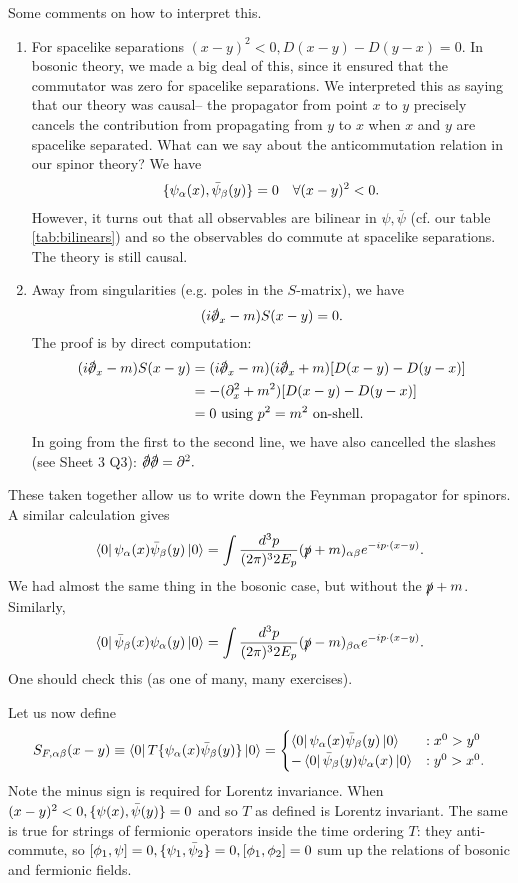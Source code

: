Some comments on how to interpret this.
\begin{enumerate}
    \item For spacelike separations $(x-y)^2<0, D(x-y)-D(y-x)=0$. In bosonic theory, we made a big deal of this, since it ensured that the commutator was zero for spacelike separations. We interpreted this as saying that our theory was causal-- the propagator from point $x$ to $y$ precisely cancels the contribution from propagating from $y$ to $x$ when $x$ and $y$ are spacelike separated. What can we say about the anticommutation relation in our spinor theory? We have
    $$\{\psi_\alpha(x),\bar \psi_\beta(y)\}=0\quad \forall(x-y)^2<0.$$
    However, it turns out that all observables are bilinear in $\psi,\bar \psi$ (cf. our table \ref{tab:bilinears}) and so the observables do commute at spacelike separations. The theory is still causal.
    \item Away from singularities (e.g. poles in the $S$-matrix), we have
    $$(i\slashed \p_x - m)S(x-y)=0.$$ The proof is by direct computation:
    \begin{align*}
        (i\slashed \p_x - m)S(x-y)&= (i\slashed \p_x -m)(i\slashed{\p}_x+m)[D(x-y)-D(y-x)]\\
        &=-(\p_x^2+m^2)[D(x-y)-D(y-x)]\\
        &=0 \text{ using }p^2=m^2 \text{ on-shell}.
    \end{align*}
    In going from the first to the second line, we have also cancelled the slashes (see Sheet 3 Q3): $\slashed{\p}\slashed{\p}=\p^2.$
\end{enumerate}

These taken together allow us to write down the Feynman propagator for spinors. A similar calculation gives
$$\left< 0 \right|\psi_\alpha(x)\bar \psi_\beta (y)\left| 0 \right>=\int \frac{d^3p}{(2\pi)^3 2E_p}(\slashed{p}+m)_{\alpha\beta} e^{-ip\cdot (x-y)}.$$
We had almost the same thing in the bosonic case, but without the $\slashed{p}+m$. Similarly,
$$\left< 0 \right|\bar \psi_\beta(x)\psi_\alpha (y)\left| 0 \right>=\int \frac{d^3p}{(2\pi)^3 2E_p}(\slashed{p}-m)_{\beta\alpha} e^{-ip\cdot (x-y)}.$$
One should check this (as one of many, many exercises).

Let us now define
\begin{equation}
    S_{F,\alpha\beta}(x-y)\equiv \left< 0 \right| T\{\psi_\alpha(x)\bar \psi_\beta(y)\}\left| 0 \right>=\begin{cases}
    \left< 0 \right|\psi_\alpha(x) \bar \psi_{\beta} (y)\left| 0 \right> & :x^0 > y^0\\
    -\left< 0 \right|\bar \psi_{\beta}(y)\psi_\alpha(x)\left| 0 \right> & :y^0>x^0.
    \end{cases}
\end{equation}
Note the minus sign is required for Lorentz invariance. When $(x-y)^2<0, \{\psi(x),\bar \psi(y)\}=0$ and so $T$ as defined is Lorentz invariant. The same is true for strings of fermionic operators inside the time ordering $T$: they anti-commute, so
$[\phi_1,\psi]=0, \{\psi_1,\bar\psi_2\}=0,[\phi_1,\phi_2]=0$
sum up the relations of bosonic and fermionic fields.

